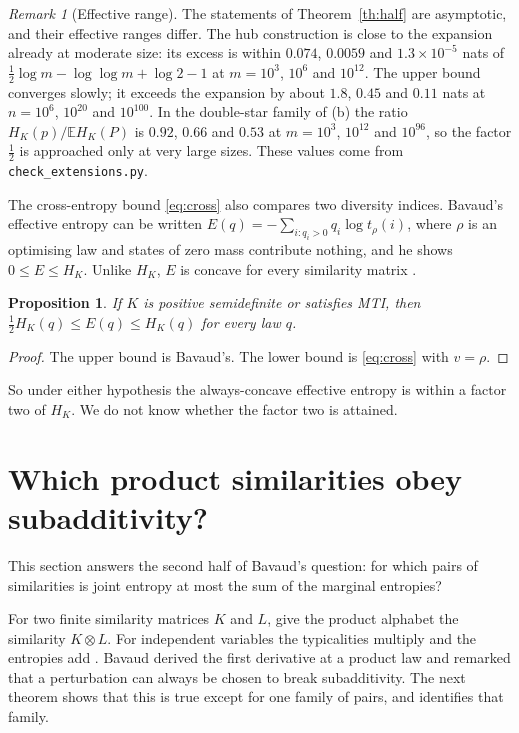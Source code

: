 \documentclass[11pt,a4paper]{article}
\newtheorem{proposition}[theorem]{Proposition}
\theoremstyle{remark}
\newtheorem{remark}[theorem]{Remark}
\begin{document}
\begin{remark}[Effective range]
The statements of Theorem~\ref{th:half} are asymptotic, and their effective ranges differ. The hub construction is close to the expansion already at moderate size: its excess is within $0.074$, $0.0059$ and $1.3\times10^{-5}$ nats of $\tfrac12\log m-\log\log m+\log2-1$ at $m=10^3$, $10^6$ and $10^{12}$. The upper bound converges slowly; it exceeds the expansion by about $1.8$, $0.45$ and $0.11$ nats at $n=10^6$, $10^{20}$ and $10^{100}$. In the double-star family of (b) the ratio $H_K(p)/\mathbb EH_K(P)$ is $0.92$, $0.66$ and $0.53$ at $m=10^3$, $10^{12}$ and $10^{96}$, so the factor $\tfrac12$ is approached only at very large sizes. These values come from \texttt{check\_extensions.py}.
\end{remark}

The cross-entropy bound \eqref{eq:cross} also compares two diversity indices. Bavaud's effective entropy \cite[equations (6), (13) and (14)]{bavaud} can be written $E(q)=-\sum_{i:q_i>0}q_i\log t_\rho(i)$, where $\rho$ is an optimising law and states of zero mass contribute nothing, and he shows $0\le E\le H_K$. Unlike $H_K$, $E$ is concave for every similarity matrix \cite[Theorem 9]{bavaud}.

\begin{proposition}\label{prop:effective}
If $K$ is positive semidefinite or satisfies MTI, then $\tfrac12H_K(q)\le E(q)\le H_K(q)$ for every law $q$.
\end{proposition}
\begin{proof}
The upper bound is Bavaud's. The lower bound is \eqref{eq:cross} with $v=\rho$.
\end{proof}

So under either hypothesis the always-concave effective entropy is within a factor two of $H_K$. We do not know whether the factor two is attained.

\section{Which product similarities obey subadditivity?}\label{sec:subadd}
This section answers the second half of Bavaud's question: for which pairs of similarities is joint entropy at most the sum of the marginal entropies?

For two finite similarity matrices $K$ and $L$, give the product alphabet the similarity $K\otimes L$. For independent variables the typicalities multiply and the entropies add \cite[Theorem 3]{gait}. Bavaud \cite[Theorem 11 and its proof]{bavaud} derived the first derivative at a product law and remarked that a perturbation can always be chosen to break subadditivity. The next theorem shows that this is true except for one family of pairs, and identifies that family.
\end{document}
